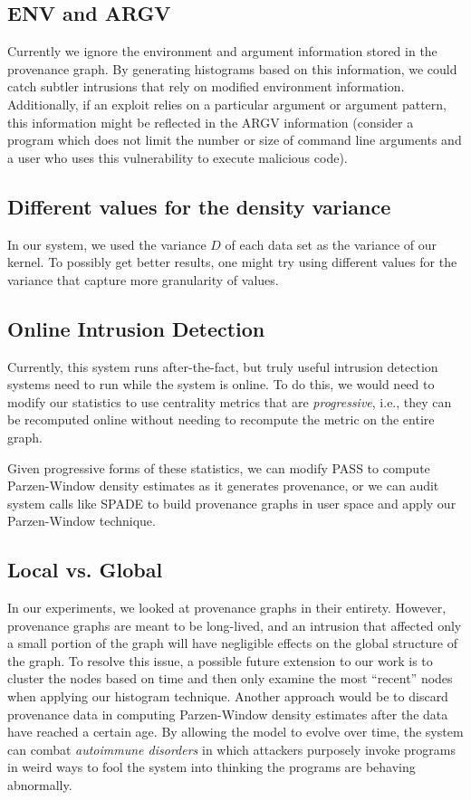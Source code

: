 \documentclass[10pt,twocolumn]{article}
\begin{document}
\subsection{ENV and ARGV}
Currently we ignore the environment and argument information stored in the provenance graph. By generating histograms based on this information, we could catch subtler intrusions that rely on modified environment information. Additionally, if an exploit relies on a particular argument or argument pattern, this information might be reflected in the ARGV information (consider a program which does not limit the number or size of command line arguments and a user who uses this vulnerability to execute malicious code).
\subsection{Different values for the density variance}
In our system, we used the variance $D$ of each data set as the variance of our kernel. To possibly get better results, one might try using different values for the variance that capture more granularity of values.
\subsection{Online Intrusion Detection}
Currently, this system runs after-the-fact, but truly useful intrusion detection systems need to run while the system is online. To do this, we would need to modify our statistics to use centrality metrics that are {\em progressive}, i.e., they can be recomputed online without needing to recompute the metric on the entire graph. 

Given progressive forms of these statistics, we can modify PASS to compute Parzen-Window density estimates as it generates provenance, or we can audit system calls like SPADE \cite{spade} to build provenance graphs in user space and apply our Parzen-Window technique.
\subsection{Local vs. Global}
In our experiments, we looked at provenance graphs in their entirety. However, provenance graphs are meant to be long-lived, and an intrusion that affected only a small portion of the graph will have negligible effects on the global structure of the graph. To resolve this issue, a possible future extension to our work is to cluster the nodes based on time \cite{clustering} and then only examine the most ``recent'' nodes when applying our histogram technique. Another approach would be to discard provenance data in computing Parzen-Window density estimates after the data have reached a certain age. By allowing the model to evolve over time, the system
can combat {\em autoimmune disorders} in which attackers purposely invoke programs in weird ways to fool the system into thinking the programs are
behaving abnormally.
\end{document}
